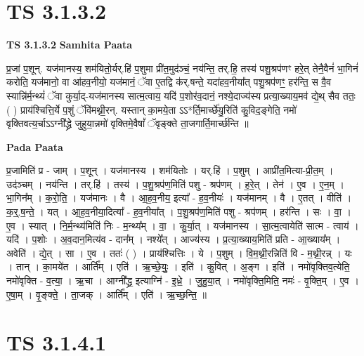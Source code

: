 \documentclass[17pt]{extarticle}
\begin{document}

\section{ TS 3.1.3.2 }

\textbf{TS 3.1.3.2 } \newline
\textbf{Samhita Paata} \newline

प्र॒जां प॒शून्. यज॑मानस्य॒ शम॑यितो॒र्यर्.हि॑ प॒शुमा प्री॑त॒मुद॑ञ्चं॒ नय॑न्ति॒ तर्.हि॒ तस्य॑ पशु॒श्रप॑णꣳ हरे॒त् तेनै॒वैनं॑ भा॒गिनं॑ करोति॒ यज॑मानो॒ वा आ॑हव॒नीयो॒ यज॑मानं॒ ॅवा ए॒तद्वि क॑र्.षन्ते॒ यदा॑हव॒नीया᳚त् पशु॒श्रप॑णꣳ॒॒ हर॑न्ति॒ स वै॒व स्यान्नि॑र्म॒न्थ्यं॑ ॅवा कुर्या॒द्-यज॑मानस्य सात्म॒त्वाय॒ यदि॑ प॒शोर॑व॒दानं॒ नश्ये॒दाज्य॑स्य प्रत्या॒ख्याय॒मव॑ द्ये॒थ् सैव ततः॒ ( ) प्राय॑श्चित्ति॒र्ये प॒शुं ॅवि॑मथ्नी॒रन्. यस्तान् का॒मये॒ता ऽऽ*र्ति॒मार्च्छे॑यु॒रिति॑ कु॒विद॒ङ्गेति॒ नमो॑ वृक्तिवत्य॒र्चाऽऽग्नी᳚द्ध्रे जुहुया॒न्नमो॑ वृक्तिमे॒वैषां᳚ ॅवृङ्क्ते ता॒जगार्ति॒मार्च्छ॑न्ति ॥ \newline

\textbf{Pada Paata} \newline

प्र॒जामिति॑ प्र - जाम् । प॒शून् । यज॑मानस्य । शम॑यितोः । यर्.हि॑ । प॒शुम् । आप्री॑त॒मित्या-प्री॒त॒म् । उद॑ञ्चम् । नय॑न्ति । तर्.हि॑ । तस्य॑ । प॒शु॒श्रप॑ण॒मिति॑ पशु - श्रप॑णम् । ह॒रे॒त् । तेन॑ । ए॒व । ए॒न॒म् । भा॒गिन᳚म् । क॒रो॒ति॒ । यज॑मानः । वै । आ॒ह॒व॒नीय॒ इत्या᳚ - ह॒व॒नीयः॑ । यज॑मानम् । वै । ए॒तत् । वीति॑ । क॒र्॒.ष॒न्ते॒ । यत् । आ॒ह॒व॒नीया॒दित्या᳚ - ह॒व॒नीया᳚त् । प॒शु॒श्रप॑ण॒मिति॑ पशु - श्रप॑णम् । हर॑न्ति । सः । वा॒ । ए॒व । स्यात् । नि॒र्म॒न्थ्य॑मिति॑ निः - म॒न्थ्य᳚म् । वा॒ । कु॒र्या॒त् । यज॑मानस्य । सा॒त्म॒त्वायेति॑ सात्म - त्वाय॑ । यदि॑ । प॒शोः । अ॒व॒दान॒मित्य॑व - दान᳚म् । नश्ये᳚त् । आज्य॑स्य । प्र॒त्या॒ख्याय॒मिति॑ प्रति - आ॒ख्याय᳚म् । अवेति॑ । द्ये॒त् । सा । ए॒व । ततः॑ ( ) । प्राय॑श्चित्तिः । ये । प॒शुम् । वि॒म॒थ्नी॒रन्निति॑ वि - म॒थ्नी॒रन्न् । यः । तान् । का॒मये॑त । आर्ति᳚म् । एति॑ । ऋ॒च्छे॒युः॒ । इति॑ । कु॒वित् । अ॒ङ्ग । इति॑ । नमो॑वृक्तिव॒त्येति॒ नमो॑वृक्ति - व॒त्या॒ । ऋ॒चा । आग्नी᳚द्ध्र॒ इत्याग्नि॑ - इ॒ध्रे॒ । जु॒हु॒या॒त् । नमो॑वृक्ति॒मिति॒ नमः॑ - वृ॒क्ति॒म् । ए॒व । ए॒षा॒म् । वृ॒ङ्क्ते॒ । ता॒जक् । आर्ति᳚म् । एति॑ । ऋ॒च्छ॒न्ति॒ ॥  \newline





\section{ TS 3.1.4.1 }
\end{document}
